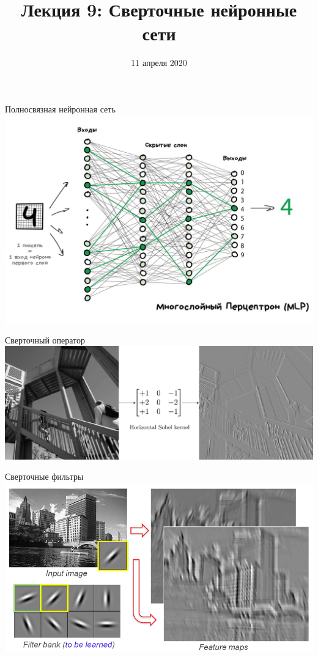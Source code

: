 \documentclass[aspectratio=169]{beamer}
\title{Лекция 9: Сверточные нейронные сети}
\date{11 апреля 2020}
\begin{document}
\maketitle

\begin{frame}{Полносвязная нейронная сеть}
    \centering
    \includegraphics[width=0.7\linewidth]{graphs/four_layers.jpg}
\end{frame}

\begin{frame}{Сверточный оператор}
    \centering
    \includegraphics[width=\linewidth]{graphs/sobel.png}
\end{frame}

\begin{frame}{Сверточные фильтры}
    \centering
    \includegraphics[width=0.85\linewidth]{graphs/conv_filter.png}
\end{frame}
\end{document}
